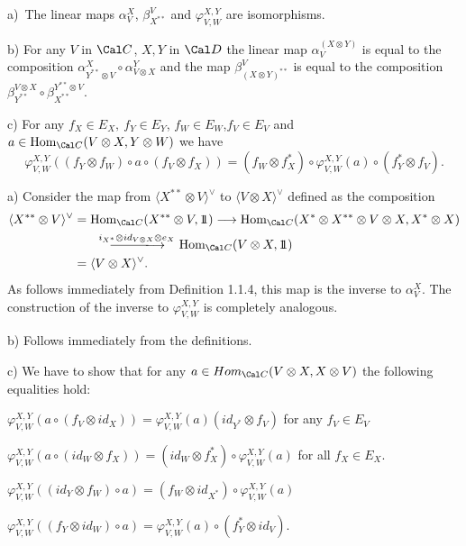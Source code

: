   a)\ The linear maps  $\alpha_V^X$, $\beta^V_{X^{**}}$  and
$\varphi_{V,W}^{X,Y}$  are isomorphisms.

b)  For any $V$ in ${\Cal C}$, $X,Y$ in
${\Cal D}$  the linear map  $\alpha_V^{(X\otimes Y)}$  is equal
to the composition  $\alpha_{Y^{**}\otimes V}^{X} \circ
\alpha_{V\otimes X}^{Y}$  and the map  $\beta^V_{(X\otimes Y)^{**}}$  is
equal to the composition  $\beta_{Y^{**}}^{V\otimes X} \circ
\beta_{X^{**}}^{Y^{**}\otimes V}$.

c)  For any $f_X \in E_X,\ f_Y \in E_Y$, $f_W \in E_W$,$f_V\in E_V$  and
$a \in \text{Hom}_{{\Cal C}}(V \otimes X, Y\otimes W)$  we have
$$
\varphi^{X,Y}_{V,W}((f_Y \otimes f_W) \circ a \circ (f_V \otimes f_X)) =
(f_W \otimes f^*_X) \circ \varphi^{X,Y}_{V,W}(a) \circ (f^*_Y \otimes
f_V).
$$
\endproclaim

  a)  Consider the map from  $\langle X^{**} \otimes V\rangle^\vee$
to  $\langle V \otimes X\rangle^\vee$ defined as the composition
$$
\aligned
\langle X^{**} \otimes V\rangle^\vee &=
\text{Hom}_{{\Cal C}}(X^{**} \otimes V, \ident) \longrightarrow
\text{Hom}_{{\Cal C}}(X^* \otimes X^{**} \otimes
V \otimes X, X^* \otimes X)\\
&\qquad {\buildrel {i_{X^*} \otimes id_{V\otimes X}
\otimes e_X}\over\llongrightarrow}\
\text{Hom}_{{\Cal C}}(V \otimes X, \ident)  \\
&= \langle V \otimes X\rangle^\vee.
\endaligned
$$
As follows immediately from Definition 1.1.4, this map is the inverse to
$\alpha_V^{X}$.  The construction of the inverse to  $\varphi_{V,W}^{X,Y}$  is
completely analogous.

b)  Follows immediately from the definitions.

c)  We have to show that for any $a \in Hom_{{\Cal C}}(V \otimes X,
X \otimes V)$  the following equalities hold:

  $\varphi^{X,Y}_{V,W}(a \circ (f_V \otimes id_X)) =
\varphi^{X,Y}_{V,W} (a)(id_{Y^{*}} \otimes f_V)$  for any  $f_V \in E_V$

  $\varphi_{V,W}^{X,Y}(a \circ (id_W \otimes f_X)) = (id_W
\otimes
f^*_X) \circ \varphi_{V,W}^{X,Y}(a)$ for all  $f_X \in E_X$.

 $\varphi^{X,Y}_{V,W}((id_Y\otimes f_W) \circ a) =
(f_W \otimes id_{X^*}) \circ \varphi^{X,Y}_{V,W}(a)$

  $\varphi^{X,Y}_{V,W}((f_Y \otimes id_W) \circ a) =
\varphi^{X,Y}_{V,W}(a) \circ (f^*_Y \otimes id_V)$.


